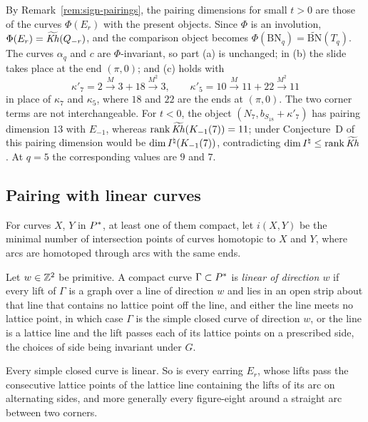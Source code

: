 \begin{remark}\label{rem:sign-positive}
By Remark~\ref{rem:sign-pairings}, the pairing dimensions for small $t>0$ are those of the curves
$\Phi(E_r)$ with the present objects.  Since $\Phi$ is an involution, $\Phi(E_r)=\widetilde{\mathit{Kh}}(Q_{-r})$, and the
comparison object becomes $\Phi(\mathrm{BN}_q)=\widetilde{\mathrm{BN}}(T_q)$.  The curves $\alpha_q$
and $c$ are $\Phi$-invariant, so part (a) is unchanged; in (b) the slide takes place at the end
$(\pi,0)$; and (c) holds with
\[
 \kappa'_7=2\xrightarrow M3+18\xrightarrow{M^2}3,\qquad \kappa'_5=10\xrightarrow M11+22\xrightarrow{M^2}11
\]
in place of $\kappa_7$ and $\kappa_5$, where $18$ and $22$ are the ends at $(\pi,0)$.  The two corner
terms are not interchangeable.  For $t<0$, the object $(N_7,b_{S_{18}}+\kappa'_7)$ has pairing dimension
$13$ with $E_{-1}$, whereas $\operatorname{rank}\widetilde{\mathit{Kh}}(K_{-1}(7))=11$; under Conjecture~D of~\cite{CHKK} this
pairing dimension would be $\dim I^{\natural}(K_{-1}(7))$, contradicting $\dim I^{\natural}\le\operatorname{rank}\widetilde{\mathit{Kh}}$
\cite{KM2}.  At $q=5$ the corresponding values are $9$ and $7$.
\end{remark}

\subsection{Pairing with linear curves}\label{ss:kh-pairing}
For curves $X$, $Y$ in $P^{*}$, at least one of them compact, let $i(X,Y)$ be the minimal number of
intersection points of curves homotopic to $X$ and $Y$, where arcs are homotoped through arcs with
the same ends.

\begin{definition}\label{def:linear}
Let $w\in\mathbb{Z}^2$ be primitive.  A compact curve $\Gamma\subset P^{*}$ is \emph{linear of direction $w$} if
every lift of $\Gamma$ is a graph over a line of direction $w$ and lies in an open strip about that line
that contains no lattice point off the line, and either the line meets no lattice point, in which case
$\Gamma$ is the simple closed curve of direction $w$, or the line is a lattice line and the lift passes
each of its lattice points on a prescribed side, the choices of side being invariant under $G$.
\end{definition}

Every simple closed curve is linear.  So is every earring $E_r$, whose lifts pass the consecutive
lattice points of the lattice line containing the lifts of its arc on alternating sides, and more
generally every figure-eight around a straight arc between two corners.

